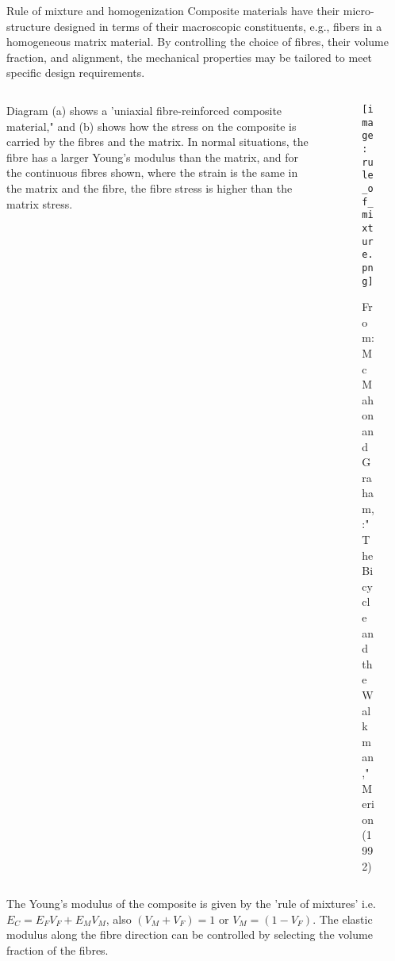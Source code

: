 \documentclass[10pt,aspectratio=169,dvipsnames]{beamer} %
\begin{document}
	\begin{frame}{Rule of mixture and homogenization}	
		\justifying\footnotesize
		\noindent Composite materials have their micro-structure designed in terms of their macroscopic constituents, e.g., fibers in a homogeneous matrix material. 
		By controlling the choice of fibres, their volume fraction, and alignment, the mechanical properties may be tailored to meet specific design requirements.
		\begin{columns}[T]				
			\begin{column}{0.45\textwidth}
				Diagram (a) shows a 'uniaxial fibre-reinforced composite material," and (b) shows how the stress on the composite is carried by the fibres and the matrix. 
				In normal situations, the fibre has a larger Young's modulus than the matrix, and for the continuous fibres shown, where the strain is the same in the matrix and the fibre, the fibre stress is higher than the matrix stress.
			\end{column}
			\begin{column}{0.45\textwidth}
				\begin{figure}
					\texttt{[image: rule\_of\_mixture.png]}
					\caption{From: McMahon and Graham, :"The Bicycle and the Walkman," Merion (1992)}
				\end{figure}
			\end{column}
		\end{columns}
		The Young's modulus of the composite is given by the 'rule of mixtures' i.e. \(E_C = E_F V_F + E_MV_M\), also \((V_M + V_F) = 1\) or \(V_M = (1 - V_F )\). 
		The elastic modulus along the fibre direction can be controlled by selecting the volume fraction of the fibres.		
	\end{frame}
\end{document}
